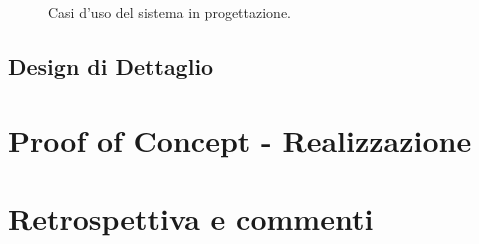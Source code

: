\documentclass[12pt,a4paper,openright,oneside]{report}
\begin{document}
\begin{figure}
	\centering
	\caption{Casi d'uso del sistema in progettazione.}
	\label{fig:use-case}
\end{figure}

\section{Design di Dettaglio}



\clearpage{\pagestyle{empty}\cleardoublepage}
\chapter{Proof of Concept - Realizzazione}           %
\lhead[\fancyplain{}{\bfseries\thepage}]{\fancyplain{}{\bfseries\rightmark}}  


\clearpage{\pagestyle{empty}\cleardoublepage}
\chapter{Retrospettiva e commenti}           %
\lhead[\fancyplain{}{\bfseries\thepage}]{\fancyplain{}{\bfseries\rightmark}}  
\end{document}
